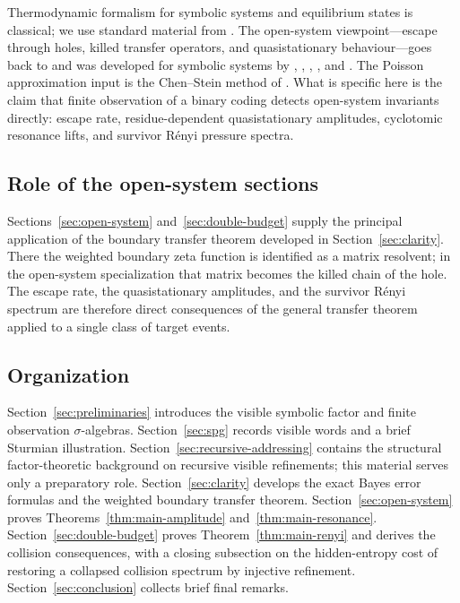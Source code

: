 Thermodynamic formalism for symbolic systems and equilibrium states is
classical; we use standard material from
\citet{Bowen2008,Ruelle1978,Walters1975GMeasures,WaltersErgodicTheory}.
The open-system viewpoint---escape through holes, killed transfer
operators, and quasistationary behaviour---goes back to
\citet{PianigianiYorke1979} and was developed for symbolic systems by
\citet{ColletMartinezSchmitt1997}, \citet{DemersYoung2006},
\citet{KellerLiverani2009}, \citet{DemersWrightYoung2012}, and
\citet{FergusonPollicott2012}.  The Poisson approximation input is the
Chen--Stein method of \citet{ArratiaGoldsteinGordon1989}.  What is
specific here is the claim that finite observation of a binary coding
detects open-system invariants directly: escape rate,
residue-dependent quasistationary amplitudes, cyclotomic resonance lifts,
and survivor R\'enyi pressure spectra.

\subsection*{Role of the open-system sections}

Sections~\ref{sec:open-system} and~\ref{sec:double-budget} supply the
principal application of the boundary transfer theorem developed in
Section~\ref{sec:clarity}.  There the weighted boundary zeta function is
identified as a matrix resolvent; in the open-system specialization that
matrix becomes the killed chain of the hole.  The escape rate, the
quasistationary amplitudes, and the survivor R\'enyi spectrum are
therefore direct consequences of the general transfer theorem applied to
a single class of target events.

\subsection*{Organization}

Section~\ref{sec:preliminaries} introduces the visible symbolic factor
and finite observation \(\sigma\)-algebras.
Section~\ref{sec:spg} records visible words and a brief Sturmian
illustration.  Section~\ref{sec:recursive-addressing} contains the
structural factor-theoretic background on recursive visible refinements;
this material serves only a preparatory role.
Section~\ref{sec:clarity} develops the exact Bayes error formulas and
the weighted boundary transfer theorem.
Section~\ref{sec:open-system} proves
Theorems~\ref{thm:main-amplitude} and~\ref{thm:main-resonance}.
Section~\ref{sec:double-budget} proves
Theorem~\ref{thm:main-renyi} and derives the collision consequences,
with a closing subsection on the hidden-entropy cost of restoring a
collapsed collision spectrum by injective refinement.
Section~\ref{sec:conclusion} collects brief final remarks.
